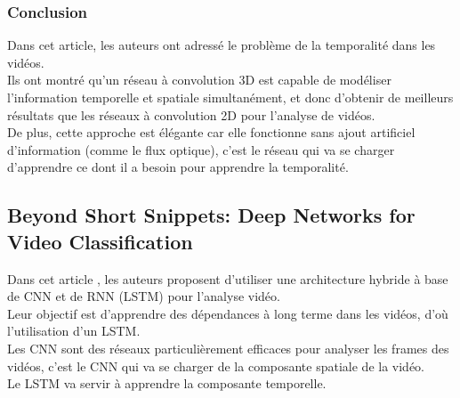 \documentclass[11pt]{article}
\begin{document}
\subsubsection{Conclusion}
\label{sec:org26d90d8}
Dans cet article, les auteurs ont adressé le problème de la temporalité dans les vidéos.\\
Ils ont montré qu'un réseau à convolution 3D est capable de modéliser l'information temporelle et spatiale simultanément, et donc d'obtenir de meilleurs résultats que les réseaux à convolution 2D pour l'analyse de vidéos.\\
De plus, cette approche est élégante car elle fonctionne sans ajout artificiel d'information (comme le flux optique), c'est le réseau qui va se charger d'apprendre ce dont il a besoin pour apprendre la temporalité.\\

\subsection{Beyond Short Snippets: Deep Networks for Video Classification}
\label{sec:orge5728bd}
Dans cet article \cite{Joe_Yue_Hei_Ng_2015}, les auteurs proposent d'utiliser une architecture hybride à base de CNN et de RNN (LSTM) pour l'analyse vidéo.\\
Leur objectif est d'apprendre des dépendances à long terme dans les vidéos, d'où l'utilisation d'un LSTM.\\
Les CNN sont des réseaux particulièrement efficaces pour analyser les frames des vidéos, c'est le CNN qui va se charger de la composante spatiale de la vidéo.\\
Le LSTM va servir à apprendre la composante temporelle.\\
\end{document}
